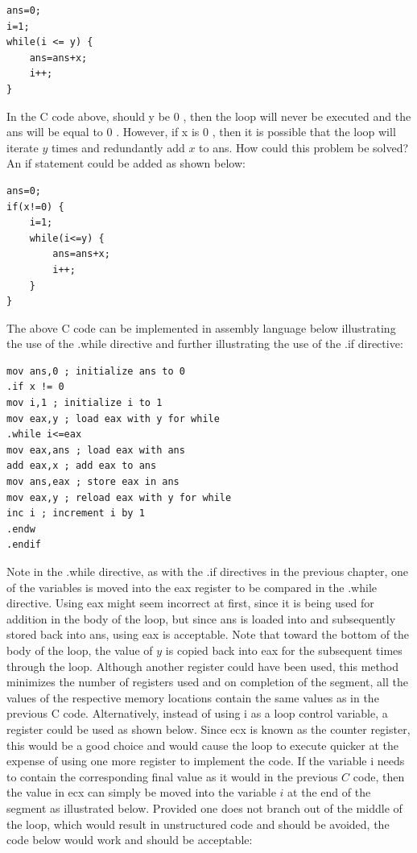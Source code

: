 \documentclass[10pt]{book}
\begin{document}
\begin{verbatim}
ans=0;
i=1;
while(i <= y) {
    ans=ans+x;
    i++;
}
\end{verbatim}

In the C code above, should y be 0 , then the loop will never be executed and the ans will be equal to 0 . However, if x is 0 , then it is possible that the loop will iterate $y$ times and redundantly add $x$ to ans. How could this problem be solved? An if statement could be added as shown below:
\begin{verbatim}
ans=0;
if(x!=0) {
    i=1;
    while(i<=y) {
        ans=ans+x;
        i++;
    }
}
\end{verbatim}

The above C code can be implemented in assembly language below illustrating the use of the .while directive and further illustrating the use of the .if directive:

\begin{verbatim}
mov ans,0 ; initialize ans to 0
.if x != 0
mov i,1 ; initialize i to 1
mov eax,y ; load eax with y for while
.while i<=eax
mov eax,ans ; load eax with ans
add eax,x ; add eax to ans
mov ans,eax ; store eax in ans
mov eax,y ; reload eax with y for while
inc i ; increment i by 1
.endw
.endif
\end{verbatim}

Note in the .while directive, as with the .if directives in the previous chapter, one of the variables is moved into the eax register to be compared in the .while directive. Using eax might seem incorrect at first, since it is being used for addition in the body of the loop, but since ans is loaded into and subsequently stored back into ans, using eax is acceptable. Note that toward the bottom of the body of the loop, the value of $y$ is copied back into eax for the subsequent times through the loop. Although another register could have been used, this method minimizes the number of registers used and on completion of the segment, all the\\
values of the respective memory locations contain the same values as in the previous C code.
Alternatively, instead of using i as a loop control variable, a register could be used as shown below. Since ecx is known as the counter register, this would be a good choice and would cause the loop to execute quicker at the expense of using one more register to implement the code. If the variable i needs to contain the corresponding final value as it would in the previous $C$ code, then the value in ecx can simply be moved into the variable $i$ at the end of the segment as illustrated below. Provided one does not branch out of the middle of the loop, which would result in unstructured code and should be avoided, the code below would work and should be acceptable:
\end{document}
